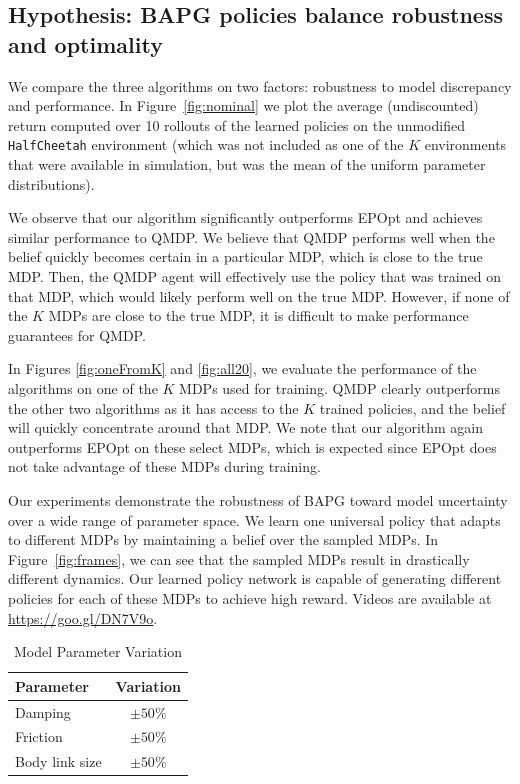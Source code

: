 \documentclass{article}
\newcommand{\figref}[1]{Figure~\ref{#1}}%
\begin{document}
\subsection{Hypothesis: BAPG policies balance robustness and optimality}

We compare the three algorithms on two factors: robustness to model discrepancy and performance.
In \figref{fig:nominal} we plot the average (undiscounted) return computed over 10 rollouts of the learned policies on the unmodified \texttt{HalfCheetah} environment (which was not included as one of the $K$ environments that were available in simulation, but was the mean of the uniform parameter distributions).

We observe that our algorithm significantly outperforms EPOpt and achieves similar performance to QMDP.
We believe that QMDP performs well when the belief quickly becomes certain in a particular MDP, which is close to the true MDP.
Then, the QMDP agent will effectively use the policy that was trained on that MDP, which would likely perform well on the true MDP.
However, if none of the $K$ MDPs are close to the true MDP, it is difficult to make performance guarantees for QMDP.

In Figures \ref{fig:oneFromK} and \ref{fig:all20}, we evaluate the performance of the algorithms on one of the $K$ MDPs used for training.
QMDP clearly outperforms the other two algorithms as it has access to the $K$ trained policies, and the belief will quickly concentrate around that MDP.
We note that our algorithm again outperforms EPOpt on these select MDPs, which is expected since EPOpt does not take advantage of these MDPs during training.

Our experiments demonstrate the robustness of BAPG toward model uncertainty over a wide range of parameter space.
We learn one universal policy that adapts to different MDPs by maintaining a belief over the sampled MDPs.
In \figref{fig:frames}, we can see that the sampled MDPs result in drastically different dynamics.
Our learned policy network is capable of generating different policies for each of these MDPs to achieve high reward.
Videos are available at \url{https://goo.gl/DN7V9o}.

\begin{table}[ht]
\centering
\begin{tabular}{l c} %
\hline\hline %
Parameter & Variation \\ %
\hline %
Damping & $\pm50\%$\\
Friction & $\pm50\%$\\
Body link size & $\pm50\%$\\%
\hline %
\end{tabular}
\bigskip
\caption{Model Parameter Variation}
\label{table:physicsParams}
\end{table}
\end{document}
